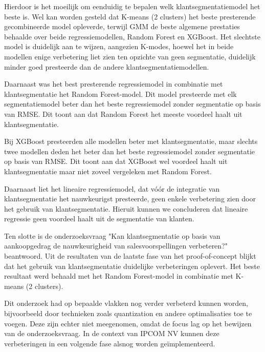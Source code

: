 \vspace{1 em} 

Hierdoor is het moeilijk om eenduidig te bepalen welk klantsegmentatiemodel het beste is. Wel kan worden gesteld dat K-means (2 clusters) het beste presterende gecombineerde model opleverde, terwijl GMM de beste algemene prestaties behaalde over beide regressiemodellen, Random Forest en XGBoost. Het slechtste model is duidelijk aan te wijzen, aangezien K-modes, hoewel het in beide modellen enige verbetering liet zien ten opzichte van geen segmentatie, duidelijk minder goed presteerde dan de andere klantsegmentatiemodellen.


\vspace{1 em} 

Daarnaast was het best presterende regressiemodel in combinatie met klantsegmentatie het Random Forest-model. Dit model presteerde met elk segmentatiemodel beter dan het beste regressiemodel zonder segmentatie op basis van RMSE. Dit toont aan dat Random Forest het meeste voordeel haalt uit klantsegmentatie. 

\vspace{1 em} 

Bij XGBoost presteerden alle modellen beter met klantsegmentatie, maar slechts twee modellen deden het beter dan het beste regressiemodel zonder segmentatie op basis van RMSE. Dit toont aan dat XGBoost wel voordeel haalt uit klantsegmentatie maar niet zoveel vergeleken met Random Forest.

\vspace{1 em} 

Daarnaast liet het lineaire regressiemodel, dat vóór de integratie van klantsegmentatie het nauwkeurigst presteerde, geen enkele verbetering zien door het gebruik van klantsegmentatie. Hieruit kunnen we concluderen dat lineaire regressie geen voordeel haalt uit de segmentatie van klanten.

\vspace{1 em} 

Ten slotte is de onderzoeksvraag "Kan klantsegmentatie op basis van aankoopgedrag de nauwkeurigheid van salesvoorspellingen verbeteren?" beantwoord. Uit de resultaten van de laatste fase van het proof-of-concept blijkt dat het gebruik van klantsegmentatie duidelijke verbeteringen oplevert. Het beste resultaat werd behaald met het Random Forest-model in combinatie met K-means (2 clusters).

\vspace{1 em} 

Dit onderzoek had op bepaalde vlakken nog verder verbeterd kunnen worden, bijvoorbeeld door technieken zoals quantization en andere optimalisaties toe te voegen. Deze zijn echter niet meegenomen, omdat de focus lag op het bewijzen van de onderzoeksvraag. In de context van IPCOM NV kunnen deze verbeteringen in een volgende fase alsnog worden geïmplementeerd.


